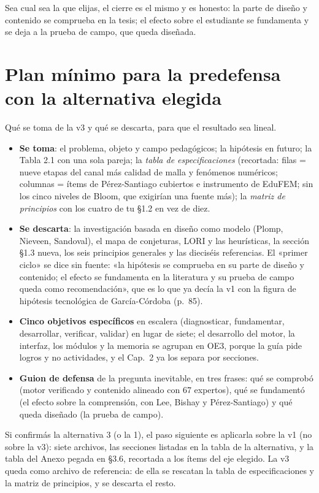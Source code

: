 \documentclass[11pt,a4paper]{article}
\begin{document}
Sea cual sea la que elijas, el cierre es el mismo y es honesto: la parte de diseño y contenido se comprueba en la tesis; el efecto sobre el estudiante se fundamenta y se deja a la prueba de campo, que queda diseñada.

\section{Plan mínimo para la predefensa con la alternativa elegida}

Qué se toma de la v3 y qué se descarta, para que el resultado sea lineal.

\begin{itemize}
\item \textbf{Se toma}: el problema, objeto y campo pedagógicos; la hipótesis en futuro; la Tabla 2.1 con una sola pareja; la \emph{tabla de especificaciones} (recortada: filas = nueve etapas del canal más calidad de malla y fenómenos numéricos; columnas = ítems de Pérez-Santiago cubiertos e instrumento de EduFEM; sin los cinco niveles de Bloom, que exigirían una fuente más); la \emph{matriz de principios} con los cuatro de tu §1.2 en vez de diez.
\item \textbf{Se descarta}: la investigación basada en diseño como modelo (Plomp, Nieveen, Sandoval), el mapa de conjeturas, LORI y las heurísticas, la sección §1.3 nueva, los seis principios generales y las dieciséis referencias. El «primer ciclo» se dice sin fuente: «la hipótesis se comprueba en su parte de diseño y contenido; el efecto se fundamenta en la literatura y su prueba de campo queda como recomendación», que es lo que ya decía la v1 con la figura de hipótesis tecnológica de García-Córdoba (p.~85).
\item \textbf{Cinco objetivos específicos} en escalera (diagnosticar, fundamentar, desarrollar, verificar, validar) en lugar de siete; el desarrollo del motor, la interfaz, los módulos y la memoria se agrupan en OE3, porque la guía pide logros y no actividades, y el Cap.~2 ya los separa por secciones.
\item \textbf{Guion de defensa} de la pregunta inevitable, en tres frases: qué se comprobó (motor verificado y contenido alineado con 67 expertos), qué se fundamentó (el efecto sobre la comprensión, con Lee, Bishay y Pérez-Santiago) y qué queda diseñado (la prueba de campo).
\end{itemize}

Si confirmás la alternativa 3 (o la 1), el paso siguiente es aplicarla sobre la v1 (no sobre la v3): siete archivos, las secciones listadas en la tabla de la alternativa, y la tabla del Anexo pegada en §3.6, recortada a los ítems del eje elegido. La v3 queda como archivo de referencia: de ella se rescatan la tabla de especificaciones y la matriz de principios, y se descarta el resto.
\end{document}
